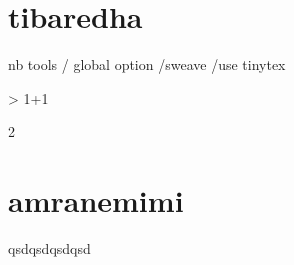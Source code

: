 \documentclass{article}
\begin{document}



\section*{tibaredha}
nb tools / global option /sweave /use tinytex


\begin{Schunk}
\begin{Sinput}
> 1+1
\end{Sinput}
\begin{Soutput}
[1] 2
\end{Soutput}
\end{Schunk}


\section*{amranemimi}
qsdqsdqsdqsd
\end{document}

